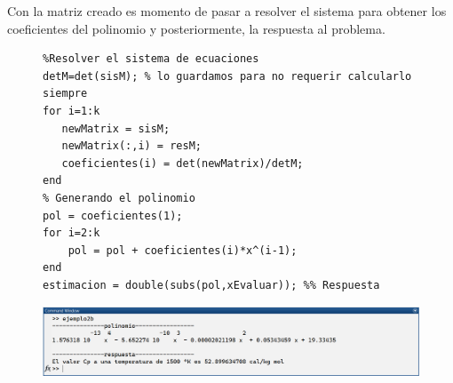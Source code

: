 \documentclass[11pt,letterpaper]{article}
\begin{document}
Con la matriz creado es momento de pasar a resolver el sistema para obtener los coeficientes del polinomio y posteriormente, la respuesta al problema.
\begin{figure}[H]
\begin{tcolorbox}[title=Ejemplo 2: Implementación en MATLAB]
\begin{verbatim}
%Resolver el sistema de ecuaciones
detM=det(sisM); % lo guardamos para no requerir calcularlo siempre
for i=1:k
   newMatrix = sisM;
   newMatrix(:,i) = resM;
   coeficientes(i) = det(newMatrix)/detM;
end
% Generando el polinomio
pol = coeficientes(1);
for i=2:k
    pol = pol + coeficientes(i)*x^(i-1);
end
estimacion = double(subs(pol,xEvaluar)); %% Respuesta
\end{verbatim}
\end{tcolorbox}
\end{figure}
\begin{figure}[H]
\centering
\includegraphics[width=6in]{ej2ans.png}
\label{figure:ej2ans}
\end{figure}
\end{document}
